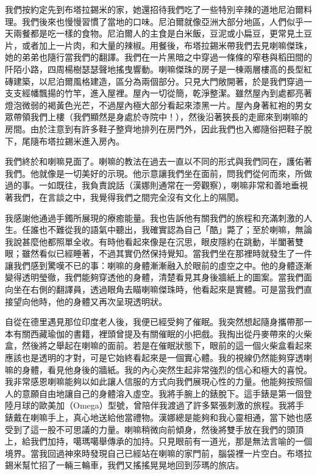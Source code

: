 我們按約定先到布塔拉錫米的家，她還招待我們吃了一些特別辛辣的道地尼泊爾料理。我們後來也慢慢習慣了當地的口味。尼泊爾就像亞洲大部分地區，人們似乎一天兩餐都是吃一樣的食物。尼泊爾人的主食是白米飯，豆泥或小扁豆，更常見土豆片，或者加上一片肉，和大量的辣椒。用餐後，布塔拉錫米帶我們去見喇嘛傑珠，她的弟弟也隨行當我們的翻譯。我們在一片黑暗之中穿過一條條的窄巷與稻田間的阡陌小路，四周楊樹瑟瑟聲地搖曳響動。喇嘛傑珠的房子是一棟兩層樓高的長型紅磚建築，以尼泊爾風格建造，區分為兩個部分。只見大門敞開著，於是我們穿過一支支經幡飄揚的竹竿，進入屋裡。屋內一切從簡，乾淨整潔。雖然屋內到處都亮著燈泡微弱的褐黃色光芒，不過屋內極大部分看起來漆黑一片。屋內身著紅袍的男女眾帶領我們上樓（我們顯然是身處於寺院中！），然後沿著狹長的走廊來到喇嘛的房間。由於注意到有許多鞋子整齊地排列在房門外，因此我們也入鄉隨俗把鞋子脫下，尾隨布塔拉錫米進入房內。


我們終於和喇嘛見面了。喇嘛的教法在過去一直以不同的形式與我們同在，護佑著我們。他就像是一切美好的示現。他示意讓我們坐在面前，問我們從何而來，所做過的事。一如既往，我負責說話（漢娜則通常在一旁觀察），喇嘛非常和善地垂視著我們，在言談之中，我覺得我們之間完全沒有文化上的隔閡。

我感謝他通過手鐲所展現的療癒能量。我也告訴他有關我們的旅程和充滿刺激的人生。任誰也不難從我的語氣中聽出，我確實認為自己「酷」斃了；至於喇嘛，無論我說甚麼他都照單全收。有時他看起來像是在沉思，眼皮隱約在跳動，半闔著雙眼；雖然看似已經睡著，不過其實仍然保持覺知。當我們坐在那裡時就發生了一件讓我們感到驚嘆不已的事：喇嘛的身體漸漸融入於眼前的虛空之中。他的身體逐漸變得透明瑩徹，我們能夠穿透他的身體，清楚看見其身後牆紙上的圖案。當我們面向坐在右側的翻譯員，透過眼角去瞄喇嘛傑珠時，他看起來是實體。可是當我們直接望向他時，他的身體又再次呈現透明狀。

自從在德里遇見那位印度老人後，我便已經受夠了催眠。我突然想起隨身攜帶那一本有關西藏瑜伽的書籍，裡頭曾提及有關催眠的小把戲。我掏出從丹麥帶來的火柴盒，然後將之舉起在喇嘛的面前。若是在催眠狀態下，眼前的這一個火柴盒看起來應該也是透明的才對，可是它始終看起來是一個實心體。我的視線仍然能夠穿透喇嘛的身體，看見他身後的牆紙。我的內心突然生起非常強烈的信心和極大的喜悅。我非常感恩喇嘛能夠以如此讓人信服的方式向我們展現心性的力量。他能夠按照個人的意願自由地讓自己的身體溶入虛空。我將手腕上的錶脫下。這手錶是第一個登陸月球的歐美加（Omega）型號，曾陪伴我渡過了許多緊張刺激的旅程。我將手錶戴在喇嘛手上，真心地送給他當禮物。漢娜總是能夠和我心靈相通，當下她也感受到了這一股不可思議的力量。喇嘛稍微向前傾身，然後將雙手放在我們的頭頂上，給我們加持，噶瑪噶舉傳承的加持。只見眼前有一道光，那是無法言喻的一個境界。當我回過神來時發現自己已經站在喇嘛的家門前，腦袋裡一片空白。布塔拉錫米幫忙招了一輛三輪車，我們又搖搖晃晃地回到莎瑪的旅店。

